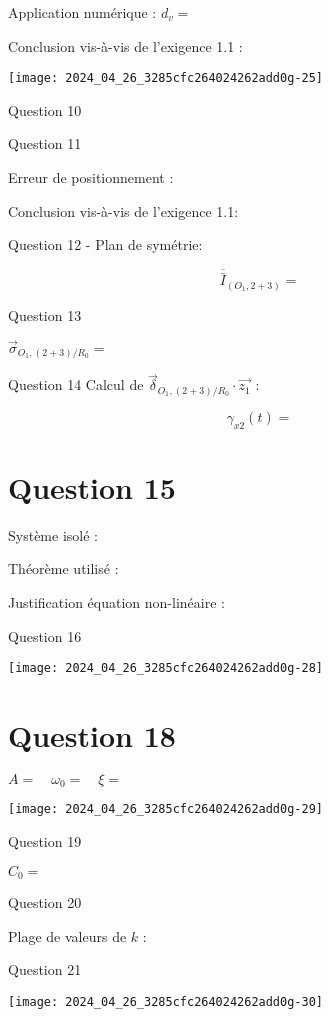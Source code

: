 Application numérique : $d_{v}=$

Conclusion vis-à-vis de l'exigence 1.1 :

\begin{center}
\texttt{[image: 2024\_04\_26\_3285cfc264024262add0g-25]}
\end{center}

Question 10

Question 11

Erreur de positionnement :

Conclusion vis-à-vis de l'exigence 1.1:

Question 12 - Plan de symétrie:

$$
\overline{\bar{I}}_{\left(O_{1}, 2+3\right)}=
$$

Question 13

$\vec{\sigma}_{O_{1},(2+3) / R_{0}}=$

Question 14 Calcul de $\vec{\delta}_{O_{1},(2+3) / R_{0}} \cdot \overrightarrow{z_{1}}$ :

$$
\gamma_{x 2}(t)=
$$

\section*{Question 15}
Système isolé :

Théorème utilisé :

Justification équation non-linéaire :

Question 16

\begin{center}
\texttt{[image: 2024\_04\_26\_3285cfc264024262add0g-28]}
\end{center}

\section*{Question 18}
$A=\quad \omega_{0}=\quad \xi=$

\begin{center}
\texttt{[image: 2024\_04\_26\_3285cfc264024262add0g-29]}
\end{center}

Question 19

$C_{0}=$

Question 20

Plage de valeurs de $k$ :

Question 21

\begin{center}
\texttt{[image: 2024\_04\_26\_3285cfc264024262add0g-30]}
\end{center}

